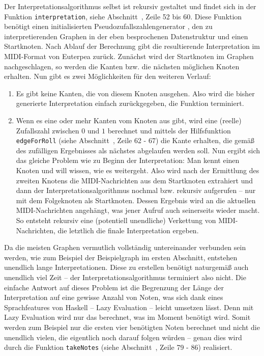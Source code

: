 \documentclass[a4paper,twocolumn]{article}
\begin{document}
Der Interpretationsalgorithmus selbst ist rekursiv \cite{wikipedia_rekursion} gestaltet und findet sich in
der Funktion \lstinline|interpretation|, siehe
Abschnitt~, Zeile 52 bis 60. Diese Funktion benötigt
einen initialisierten Pseudozufallszahlengenerator
\cite{random_random_gen,wikipedia_prng}, den
zu interpretierenden Graphen in der eben besprochenen Datenstruktur und einen
Startknoten. Nach Ablauf der Berechnung gibt die resultierende Interpretation
im MIDI-Format von Euterpea \cite{euterpea} zurück. Zunächst wird der Startknoten
im Graphen nachgeschlagen, so werden die Kanten bzw. die nächsten möglichen Knoten
erhalten. Nun gibt es zwei Möglichkeiten für den weiteren Verlauf:
\begin{enumerate}
  \item Es gibt keine Kanten, die von diesem Knoten ausgehen. Also wird die
    bisher generierte Interpretation einfach zurückgegeben, die Funktion
    terminiert.
  \item Wenn es eine oder mehr Kanten vom Knoten aus gibt, wird eine (reelle) Zufallszahl
    zwischen $0$ und $1$ berechnet und mittels der Hilfsfunktion \lstinline|edgeForRoll|
    (siehe Abschnitt~, Zeile 62 - 67) die
    Kante erhalten, die gemäß des zufälligen Ergebnisses als nächstes abgelaufen werden
    soll. Nun ergibt sich das gleiche Problem wie zu Beginn der
    Interpretation: Man kennt einen Knoten und will wissen, wie es weitergeht. Also
    wird nach der Ermittlung des zweiten Knotens die MIDI-Nachrichten aus dem
    Startknoten extrahiert und dann der Interpretationsalgorithmus nochmal bzw.
    rekursiv aufgerufen -- nur mit dem Folgeknoten als Startknoten. Dessen
    Ergebnis wird an die aktuellen MIDI-Nachrichten angehängt, was jener Aufruf auch
    seinerseits wieder macht. So entsteht rekursiv eine (potentiell unendliche)
    Verkettung von MIDI-Nachrichten, die letztlich die finale Interpretation ergeben.
\end{enumerate}

Da die meisten Graphen vermutlich vollständig untereinander verbunden sein
werden, wie zum Beispiel der Beispielgraph im ersten Abschnitt, entstehen unendlich
lange Interpretationen. Diese zu erstellen benötigt naturgemäß auch
unendlich viel Zeit -- der Interpretationsalgorithmus terminiert also nicht.
Die einfache Antwort auf dieses Problem ist die Begrenzung der Länge der
Interpretation auf eine gewisse Anzahl von Noten, was sich dank eines
Sprachfeatures von Haskell -- Lazy Evaluation \cite{wikipedia_laziness} --
leicht umsetzen lässt. Denn mit Lazy Evaluation wird nur das berechnet, was im
Moment benötigt wird. Somit werden zum Beispiel nur die ersten vier benötigten
Noten berechnet und nicht die unendlich vielen, die eigentlich noch darauf folgen
würden -- genau dies wird durch die Funktion
\lstinline|takeNotes| (siehe
Abschnitt~, Zeile 79 - 86) realisiert.
\end{document}
